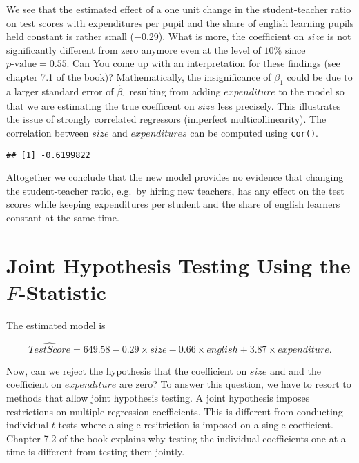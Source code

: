 \documentclass[]{book}
\newenvironment{Shaded}{\begin{snugshade}}{\end{snugshade}}
\newcommand{\KeywordTok}[1]{\textcolor[rgb]{0.13,0.29,0.53}{\textbf{#1}}}
\newcommand{\OperatorTok}[1]{\textcolor[rgb]{0.81,0.36,0.00}{\textbf{#1}}}
\newcommand{\NormalTok}[1]{#1}
\theoremstyle{definition}
\theoremstyle{definition}
\theoremstyle{definition}
\theoremstyle{remark}
\begin{document}
We see that the estimated effect of a one unit change in the
student-teacher ratio on test scores with expenditures per pupil and the
share of english learning pupils held constant is rather small
(\(-0.29\)). What is more, the coefficient on \(size\) is not
significantly different from zero anymore even at the level of \(10\%\)
since \(p\text{-value}=0.55\). Can You come up with an interpretation
for these findings (see chapter 7.1 of the book)? Mathematically, the
insignificance of \(\beta_1\) could be due to a larger standard error of
\(\hat{\beta}_1\) resulting from adding \(expenditure\) to the model so
that we are estimating the true coefficent on \(size\) less precisely.
This illustrates the issue of strongly correlated regressors (imperfect
multicollinearity). The correlation between \(size\) and
\(expenditures\) can be computed using \texttt{cor()}.

\begin{Shaded}
\end{Shaded}

\begin{verbatim}
## [1] -0.6199822
\end{verbatim}

Altogether we conclude that the new model provides no evidence that
changing the student-teacher ratio, e.g.~by hiring new teachers, has any
effect on the test scores while keeping expenditures per student and the
share of english learners constant at the same time.

\section{\texorpdfstring{Joint Hypothesis Testing Using the
\(F\)-Statistic}{Joint Hypothesis Testing Using the F-Statistic}}\label{joint-hypothesis-testing-using-the-f-statistic}

The estimated model is

\[ \widehat{TestScore} = 649.58 -0.29 \times size - 0.66 \times english + 3.87 \times expenditure. \]

Now, can we reject the hypothesis that the coefficient on \(size\) and
and the coefficient on \(expenditure\) are zero? To answer this
question, we have to resort to methods that allow joint hypothesis
testing. A joint hypothesis imposes restrictions on multiple regression
coefficients. This is different from conducting individual \(t\)-tests
where a single resitriction is imposed on a single coefficient. Chapter
7.2 of the book explains why testing the individual coefficients one at
a time is different from testing them jointly.
\end{document}
